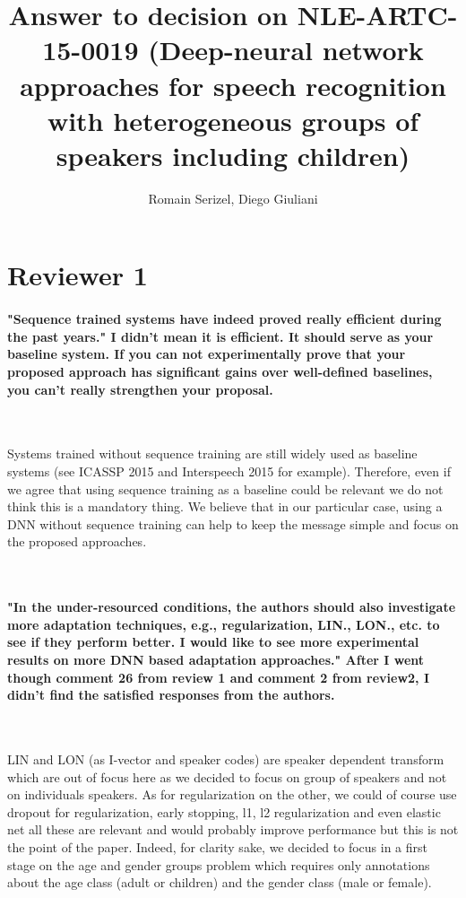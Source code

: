 \documentclass[]{article}
\title{Answer to decision on NLE-ARTC-15-0019 (Deep-neural network approaches for speech recognition with heterogeneous groups of speakers including children)}
\author{Romain Serizel, Diego Giuliani}
\begin{document}
\maketitle


\section{Reviewer 1}
\paragraph{"Sequence trained systems have indeed proved really efficient during the past years." I didn't mean it is efficient. It should serve as your baseline system. If you can not experimentally prove that your proposed approach has significant gains over well-defined baselines, you can't really strengthen your proposal.}

~

Systems trained without sequence training are still widely used as baseline systems (see ICASSP 2015 and Interspeech 2015 for example). Therefore, even if we agree that using sequence training as a baseline could be relevant we do not think this is a mandatory thing. We believe that in our particular case, using a DNN without sequence training can help to keep the message simple and focus on the proposed approaches.

~

\paragraph{"In the under-resourced conditions, the authors should also investigate more adaptation techniques, e.g., regularization, LIN., LON., etc. to see if they perform better. I would like to see more experimental results on more DNN based adaptation approaches." After I went though comment 26 from review 1 and comment 2 from review2, I didn't find the satisfied responses from the authors.}

~

LIN and LON (as I-vector and speaker codes) are speaker dependent transform which are out of focus here as we decided to focus on group of speakers and not on individuals speakers. As for regularization on the other, we could of course use dropout for regularization, early stopping, l1, l2 regularization and even elastic net all these are relevant and would probably improve performance but this is not the point of the paper. Indeed, for clarity sake, we decided to focus in a first stage on the age and gender groups problem which requires only annotations about the age class (adult or children) and the gender class (male or female). 
\end{document}
